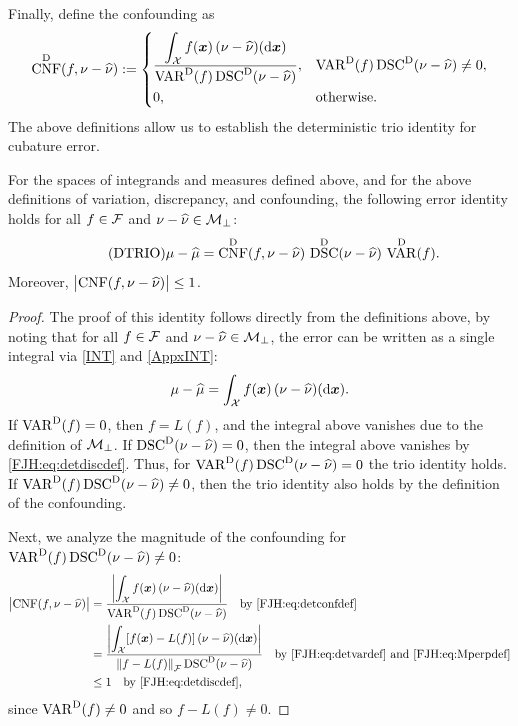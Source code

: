 \documentclass[graybox,footinfo]{svmult}
\DeclareMathOperator{\algn}{CNF}
\DeclareMathOperator{\disc}{DSC}
\DeclareMathOperator{\Var}{VAR}
\begin{document}
Finally, define the confounding as 
	\begin{equation} \label{FJH:eq:detconfdef}
\algn^\Dt(f,\nu - \hnu): =  \begin{cases} \displaystyle 
\frac{\displaystyle\int_{\cx} f(\bsx) \, (\nu - \hnu)(\D 
	\bsx)}{\Var^\Dt(f)\disc^\Dt(\nu - \hnu)},  & 
\Var^\Dt(f)\disc^\Dt(\nu - \hnu) \ne 0, \\[2ex]
0, & \text{otherwise}.
\end{cases}
\end{equation}
The above definitions allow us to establish the deterministic trio identity for cubature 
error.

\begin{theorem}  For the spaces of integrands and 
measures defined above, and for the above definitions of variation, discrepancy, and 
confounding, the following error identity holds for all $f \in \mathcal{F}$ and $\nu - \widehat{\nu}  \in 
\mathcal{M}_\bot$: 
\begin{equation} \tag{DTRIO} \label{FJH:eq:dtrio}
\mu - \hmu  = \algn^\Dt(f,\nu - \hnu) \, \disc^\Dt(\nu - \hnu) \, \Var^{\Dt}(f).
\end{equation}
Moreover, $\abs{\algn(f,\nu - \hnu)} \le 1$. 
\end{theorem}
\begin{proof}  The proof of this identity follows directly from the definitions above, by 
noting that for all $f \in \mathcal{F}$ and $\nu - \widehat{\nu}  \in \mathcal{M}_\bot$, the error can be written as a 
single integral via \eqref{INT} and \eqref{AppxINT}:
	\begin{equation} \label{FJH:eq:err_as_int}
	\mu - \hmu   =  \int_{\cx} f(\bsx) \, (\nu - \hnu)(\D \bsx).
	\end{equation}
	If $\Var^{\Dt}(f) = 0$, then $f = L(f)$, and the integral above vanishes due to the 
	definition of $\mathcal{M}_{\bot}$.  If $\disc^\Dt(\nu - \hnu) = 0$, then the integral above 
	vanishes by \eqref{FJH:eq:detdiscdef}.  Thus, for $\Var^{\Dt}(f) \disc^\Dt(\nu - \hnu) = 
	0$ 
	the trio identity holds. If $\Var^{\Dt}(f) \disc^\Dt(\nu - \hnu) \ne 0$, then the trio 
	identity also holds by the definition of the confounding.
	
	Next, we analyze the magnitude of the confounding for $\Var^{\Dt}(f) \disc^\Dt(\nu - 
	\hnu) \ne 0$: 
	\begin{align*}
	\abs{\algn(f,\nu - \hnu)} & = 
		\frac{\biggl \lvert\displaystyle\int_{\cx} f(\bsx) \, (\nu - \hnu)(\D 
			\bsx) \biggr \rvert}{\Var^\Dt(f)\disc^\Dt(\nu - \hnu)} \quad \text{by 
			\eqref{FJH:eq:detconfdef}}\\
		& = \frac{\biggl \lvert\displaystyle\int_{\cx} [f(\bsx) - L(f)] \, (\nu - \hnu)(\D 
			\bsx) \biggr \rvert}{\norm{f-L(f)}_{\cf}\disc^\Dt(\nu - \hnu)} \quad \text{by 
			\eqref{FJH:eq:detvardef} and \eqref{FJH:eq:Mperpdef}} \\
		& \le 1 \quad \text{by \eqref{FJH:eq:detdiscdef}},
\end{align*}
since $\Var^{\Dt}(f) \ne 0$ and so $f - L(f) \ne 0$.
\end{proof}
\end{document}

